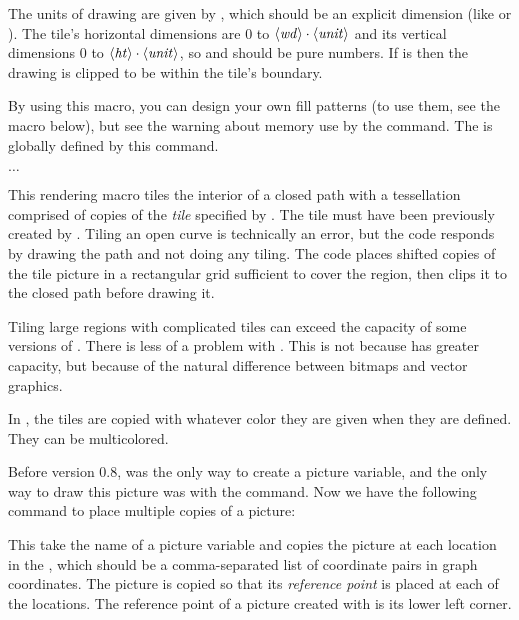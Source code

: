 \documentclass[letterpaper]{article}
\begin{document}
The units of drawing are given by , which should be an
explicit dimension (like \dim{1pt} or \dim{.2in}). The tile's horizontal
dimensions are $0$ to $\langle\mbox{\rmfamily\itshape wd\/}\rangle\cdot\langle\mbox{\rmfamily\itshape unit\/}\rangle$ and its vertical
dimensions $0$ to $\langle\mbox{\rmfamily\itshape ht\/}\rangle\cdot\langle\mbox{\rmfamily\itshape unit\/}\rangle$, so  and
 should be pure numbers. If  is  then the
drawing is clipped to be within the tile's boundary.

By using this macro, you can design your own fill patterns (to use them,
see the  macro below), but see the warning about memory use by
the  command. The  is globally defined by this
command.

\begin{cd}
$\ldots$%
\end{cd}

This rendering macro tiles the interior of a closed path with a
tessellation comprised of copies of the \emph{tile} specified by
. The tile must have been previously created by
. Tiling an open curve is
technically an error, but the \MF{} code responds by drawing the path
and not doing any tiling. The \MF{} code places shifted copies of the
tile picture in a rectangular grid sufficient to cover the region, then
clips it to the closed path before drawing it.

Tiling large regions with complicated tiles can exceed the capacity of
some versions of \MP{}. There is less of a problem with \MF{}. This is not
because \MF{} has greater capacity, but because of the natural
difference between bitmaps and vector graphics.

In \MP{}, the tiles are copied with whatever color they are given when
they are defined. They can be multicolored.

Before version 0.8,  was the only way to create a picture
variable, and the only way to draw this picture was with the 
command. Now we have the following command to place multiple copies of
a picture:

\begin{cd}
\end{cd}

This take the name of a picture variable and copies the picture at each
location in the , which should be a comma-separated list of
coordinate pairs in graph coordinates. The picture is copied so that its
\emph{reference point} is placed at each of the locations. The reference
point of a picture created with  is its lower left corner.
\end{document}
